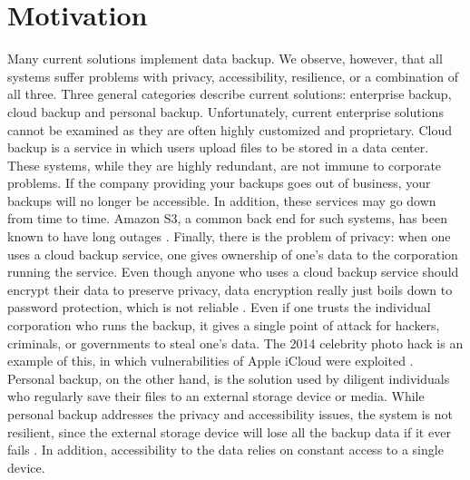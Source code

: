\section{Motivation}
Many current solutions implement data backup. We observe, however, that all systems suffer problems with privacy, accessibility, resilience, or a combination of all three. Three general categories describe current solutions: enterprise backup, cloud backup and personal backup. Unfortunately, current enterprise solutions cannot be examined as they are often highly customized and proprietary. Cloud backup is a service in which users upload files to be stored in a data center. These systems, while they are highly redundant, are not immune to corporate problems. If the company providing your backups goes out of business, your backups will no longer be accessible. In addition, these services may go down from time to time. Amazon S3, a common back end for such systems, has been known to have long outages  .  Finally, there is the problem of privacy: when one uses a cloud backup service, one gives ownership of one's data to the corporation running the service.  Even though anyone who uses a cloud backup service should encrypt their data to preserve privacy, data encryption really just boils down to password protection, which is not reliable .  Even if one trusts the individual corporation who runs the backup, it gives a single point of attack for hackers, criminals, or governments to steal one's data.  The 2014 celebrity photo hack is an example of this, in which vulnerabilities of Apple iCloud were exploited .  Personal backup, on the other hand, is the solution used by diligent individuals who regularly save their files to an external storage device or media. While personal backup addresses the privacy and accessibility issues, the system is not resilient, since the external storage device will lose all the backup data if it ever fails . In addition, accessibility to the data relies on constant access to a single device.

